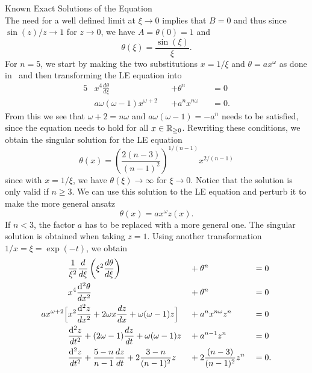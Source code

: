 \begin{subsection}{Known Exact Solutions of the \texorpdfstring{}{LE} Equation}
\begin{equation}
\end{equation}
The need for a well defined limit at $\xi\rightarrow0$ implies that $B=0$ and thus since $\sin(z)/z\rightarrow1$ for $z\rightarrow0$, we have $A=\theta(0)=1$ and
\begin{equation}
	\theta(\xi) = \frac{\sin(\xi)}{\xi}.
	\label{eq:99-App-LE-Sol-N1-Result}
\end{equation}
For $n=5$, we start by making the two substitutions $x=1/\xi$ and $\theta=ax^\omega$ as done in~\cite[94\psqq]{chandrasekharChandrasekharAnIntroductionStudy1958} and then transforming the \ac{LE} equation into
\begin{alignat}{5}
	&x^4\frac{d\theta}{d\xi}&&+\theta^n&&=0\\
	&a\omega(\omega-1)x^{\omega+2}&&+a^n x^{n\omega} &&=0.
\end{alignat}
From this we see that $\omega+2=n\omega$ and $a\omega(\omega-1)=-a^n$ needs to be satisfied, since the equation needs to hold for all $x\in\mathbb{R}_{\geq0}$.
Rewriting these conditions, we obtain the singular solution for the \ac{LE} equation
\begin{equation}
	\theta(x) = \left(\frac{2(n-3)}{(n-1)^2}\right)^{1/(n-1)}x^{2/(n-1)}
	\label{eq:99-App-LE-Sol-N2}
\end{equation}
since with $x=1/\xi$, we have $\theta(\xi)\rightarrow\infty$ for $\xi\rightarrow0$.
Notice that the solution is only valid if $n\geq3$.
We can use this solution to the \ac{LE} equation and perturb it to make the more general ansatz
\begin{equation}
	\theta(x) = ax^\omega z(x).
	\label{eq:99-App-LE-Sol-Singular}
\end{equation}
If $n<3$, the factor $a$ has to be replaced with a more general one.
The singular solution is obtained when taking $z=1$.
Using another transformation $1/x=\xi=\exp(-t)$, we obtain
\begin{alignat}{5}
	&\frac{1}{\xi^2}\frac{d}{d\xi}\left(\xi^2\frac{d\theta}{d\xi}\right) &&+ \theta^n &&=0\\
	&x^4\frac{\diff^2 \theta}{dx^2} &&+ \theta^n &&=0\\
	ax^{\omega+2}\Bigl[&x^2\frac{\diff^2 z}{dx^2} + 2\omega x\frac{dz}{dx} + \omega(\omega-1)z\Bigr] &&+ a^n x^{n\omega}z^n &&=0\\
	&\frac{\diff^2 z}{dt^2} + (2\omega-1)\frac{dz}{dt}+\omega(\omega-1)z &&+ a^{n-1}z^n &&=0\\
	&\frac{\diff^2 z}{dt^2} + \frac{5-n}{n-1}\frac{dz}{dt} + 2\frac{3-n}{(n-1)^2}z &&+ 2\frac{(n-3)}{(n-1)^2}z^n &&=0.

\end{alignat}
\end{subsection}
